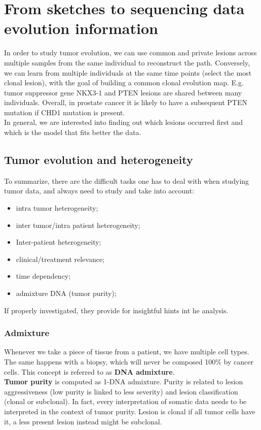 \section{From sketches to sequencing data evolution information}
In order to study tumor evolution, we can use common and private lesions across multiple samples from the same individual to reconstruct the path. 
Conversely, we can learn from multiple individuals at the same time points (select the most clonal lesion), with the goal of building a common clonal evolution map.
E.g. tumor suppressor gene NKX3-1 and PTEN lesions are shared between many individuals. Overall, in prostate cancer it is likely to have a subsequent PTEN mutation if CHD1 mutation is present.
\\
In general, we are interested into finding out which lesions occurred first and which is the model that fits better the data.

\subsection{Tumor evolution and heterogeneity}
To summarize, there are the difficult tasks one has to deal with when studying tumor data, and always need to study and take into account:
\begin{itemize}
\item intra tumor heterogeneity;
\item inter tumor/intra patient heterogeneity;
\item Inter-patient heterogeneity;
\item clinical/treatment relevance;
\item time dependency;
\item admixture DNA (tumor purity);
\end{itemize}

If properly investigated, they provide for insightful hints int he analysis.

\subsubsection{Admixture}
Whenever we take a piece of tissue from a patient, we have multiple cell types. The same happens with a biopsy, which will never be composed 100\% by cancer cells. This concept is referred to as \textbf{DNA admixture}.
\\
\textbf{Tumor purity} is computed as 1-DNA admixture. Purity is related to lesion aggressiveness (low purity is linked to less severity) and lesion classification (clonal or subclonal). In fact, every interpretation of somatic data needs to be interpreted in the context of tumor purity. Lesion is clonal if all tumor cells have it, a less present lesion instead might be subclonal.

